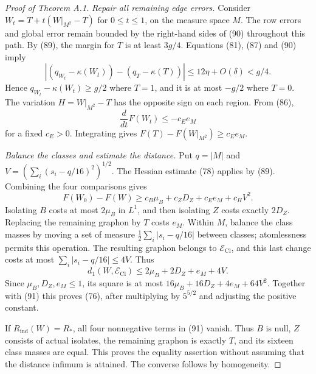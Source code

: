 \begin{proof}[Proof of Theorem A.1]
\emph{Repair all remaining edge errors.} Consider
$W_t=T+t(W|_{M^2}-T)$ for $0\leq t\leq1$, on the measure space $M$.
The row errors and global error remain bounded by the right-hand
sides of (90) throughout this path. By (89), the margin for $T$ is at
least $3g/4$. Equations (81), (87) and (90) imply
\[
 |(q_{W_t}-\kappa(W_t))-(q_T-\kappa(T))|
 \leq12\eta+O(\delta)<g/4.
\]
Hence $q_{W_t}-\kappa(W_t)\geq g/2$ where $T=1$, and it is at most
$-g/2$ where $T=0$. The variation $H=W|_{M^2}-T$ has the opposite
sign on each region. From (86),
\[
 \frac{d}{dt}F(W_t)\leq-c_Ee_M
\]
for a fixed $c_E>0$. Integrating gives
$F(T)-F(W|_{M^2})\geq c_Ee_M$.

\emph{Balance the classes and estimate the distance.} Put $q=|M|$
and $V=(\sum_i(s_i-q/16)^2)^{1/2}$. The Hessian estimate (78) applies
by (89). Combining the four comparisons gives
\begin{equation}\tag{91}\label{eq:four-defects}
 F(W_0)-F(W)\geq c_B\mu_B+c_ZD_Z+c_Ee_M+c_HV^2.
\end{equation}
Isolating $B$ costs at most $2\mu_B$ in $L^1$, and then isolating $Z$
costs exactly $2D_Z$. Replacing the remaining graphon by $T$ costs
$e_M$. Within $M$, balance the class masses by moving a set of measure
$\tfrac12\sum_i|s_i-q/16|$ between classes; atomlessness permits this
operation. The resulting graphon belongs to $\mathcal E_{\mathrm{Cl}}$,
and this last change costs at most $\sum_i|s_i-q/16|\leq4V$. Thus
\[
 d_1(W,\mathcal E_{\mathrm{Cl}})\leq2\mu_B+2D_Z+e_M+4V.
\]
Since $\mu_B,D_Z,e_M\leq1$, its square is at most
$16\mu_B+16D_Z+4e_M+64V^2$. Together with (91) this proves (76),
after multiplying by $5^{5/2}$ and adjusting the positive constant.

If $R_{\mathrm{ind}}(W)=R_\ast$, all four nonnegative terms in (91)
vanish. Thus $B$ is null, $Z$ consists of actual isolates, the
remaining graphon is exactly $T$, and its sixteen class masses are
equal. This proves the equality assertion without assuming that the
distance infimum is attained. The converse follows by homogeneity.
\end{proof}
